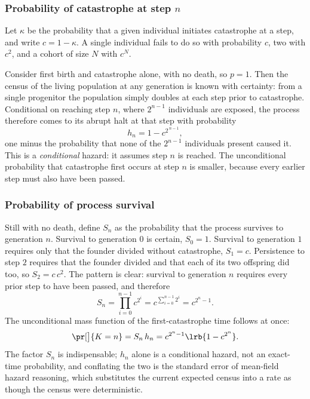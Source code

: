 \subsubsection*{Probability of catastrophe at step \texorpdfstring{$n$}{n}}

Let $\kappa$ be the probability that a given individual initiates catastrophe at a
step, and write $c = 1-\kappa$. A single individual fails to do so with probability
$c$, two with $c^2$, and a cohort of size $N$ with $c^N$.

Consider first birth and catastrophe alone, with no death, so $p=1$. Then the
census of the living population at any generation is known with certainty: from a
single progenitor the population simply doubles at each step prior to catastrophe.
Conditional on reaching step $n$, where $2^{n-1}$ individuals are exposed, the
process therefore comes to its abrupt halt at that step with probability
\begin{equation}
\label{m:eq:bdchalt}
h_n = 1-c^{2^{\,n-1}},
\end{equation}
one minus the probability that none of the $2^{n-1}$ individuals present caused it.
This is a \emph{conditional} hazard: it assumes step $n$ is reached. The
unconditional probability that catastrophe first occurs at step $n$ is smaller,
because every earlier step must also have been passed.

\subsubsection*{Probability of process survival}

Still with no death, define $S_n$ as the probability that the process survives to
generation $n$. Survival to generation $0$ is certain, $S_0=1$. Survival to
generation $1$ requires only that the founder divided without catastrophe,
$S_1=c$. Persistence to step $2$ requires that the founder divided and that
each of its two offspring did too, so $S_2 = c\,c^2$. The pattern
is clear: survival to generation $n$ requires every prior step to have been passed,
and therefore
\begin{equation}
\label{m:eq:bdcS}
S_n = \prod_{i=0}^{n-1}c^{2^i}
= c^{\sum_{i=0}^{n-1}2^i}
= c^{2^n-1} .
\end{equation}
The unconditional mass function of the first-catastrophe time follows at once:
\begin{equation}
\label{m:eq:bdcfirst}
\pr[\big]{K = n} = S_n\,h_n = c^{2^n-1}\lrb{1-c^{2^n}} .
\end{equation}
The factor $S_n$ is indispensable; $h_n$ alone is a conditional hazard, not an
exact-time probability, and conflating the two is the standard error of mean-field
hazard reasoning, which substitutes the current expected census into a rate as
though the census were deterministic.

